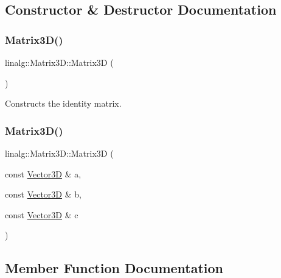 \subsection{Constructor \& Destructor Documentation}
\mbox{\label{classlinalg_1_1Matrix3D_a868d0ba8d6ad2fcccc39c1633a5a854a}} 
\subsubsection{\texorpdfstring{Matrix3D()}{Matrix3D()}\hspace{0.1cm}{\footnotesize\ttfamily [1/2]}}
{\footnotesize\ttfamily linalg\+::\+Matrix3\+D\+::\+Matrix3D (\begin{DoxyParamCaption}{ }\end{DoxyParamCaption})}



Constructs the identity matrix. 

\mbox{\label{classlinalg_1_1Matrix3D_a3a7ce553d163d01e112c55a1afa712ca}} 
\subsubsection{\texorpdfstring{Matrix3D()}{Matrix3D()}\hspace{0.1cm}{\footnotesize\ttfamily [2/2]}}
{\footnotesize\ttfamily linalg\+::\+Matrix3\+D\+::\+Matrix3D (\begin{DoxyParamCaption}\item[{const \mbox{\hyperlink{classVector3D}{Vector3D}} \&}]{a,  }\item[{const \mbox{\hyperlink{classVector3D}{Vector3D}} \&}]{b,  }\item[{const \mbox{\hyperlink{classVector3D}{Vector3D}} \&}]{c }\end{DoxyParamCaption})\hspace{0.3cm}{\ttfamily [inline]}}



\subsection{Member Function Documentation}
\mbox{\label{classlinalg_1_1Matrix3D_a1021460c27da3f21690b68a2c7dea870}} 
